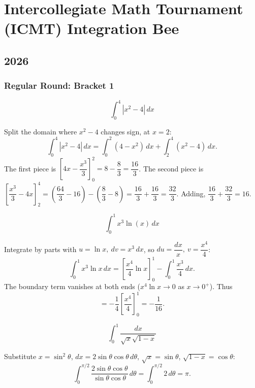 \pagebreak

\section{Intercollegiate Math Tournament (ICMT) Integration Bee}
\subsection*{2026}

\subsubsection*{Regular Round: Bracket 1}
\begin{questions}

\question \[\int_0^4 |x^2-4|\,dx\]
\begin{solution}
Split the domain where $x^2-4$ changes sign, at $x=2$:
\[
\int_0^4 |x^2-4|\,dx=\int_0^2(4-x^2)\,dx+\int_2^4(x^2-4)\,dx.
\]
The first piece is $\left[4x-\dfrac{x^3}{3}\right]_0^2=8-\dfrac{8}{3}=\dfrac{16}{3}$.
The second piece is $\left[\dfrac{x^3}{3}-4x\right]_2^4=\left(\dfrac{64}{3}-16\right)-\left(\dfrac{8}{3}-8\right)=\dfrac{16}{3}+\dfrac{16}{3}=\dfrac{32}{3}$.
Adding, $\dfrac{16}{3}+\dfrac{32}{3}=16$.
\end{solution}

\question \[\int_0^1 x^3\ln(x)\,dx\]
\begin{solution}
Integrate by parts with $u=\ln x,\ dv=x^3\,dx$, so $du=\dfrac{dx}{x},\ v=\dfrac{x^4}{4}$:
\[
\int_0^1 x^3\ln x\,dx=\left[\frac{x^4}{4}\ln x\right]_0^1-\int_0^1\frac{x^3}{4}\,dx.
\]
The boundary term vanishes at both ends ($x^4\ln x\to0$ as $x\to0^+$). Thus
\[
=-\frac14\left[\frac{x^4}{4}\right]_0^1=-\frac{1}{16}.
\]
\end{solution}

\question \[\int_0^1 \frac{dx}{\sqrt{x}\sqrt{1-x}}\]
\begin{solution}
Substitute $x=\sin^2\theta$, $dx=2\sin\theta\cos\theta\,d\theta$, $\sqrt{x}=\sin\theta$, $\sqrt{1-x}=\cos\theta$:
\[
\int_0^{\pi/2}\frac{2\sin\theta\cos\theta}{\sin\theta\cos\theta}\,d\theta=\int_0^{\pi/2}2\,d\theta=\pi.
\]
\end{solution}

\end{questions}

